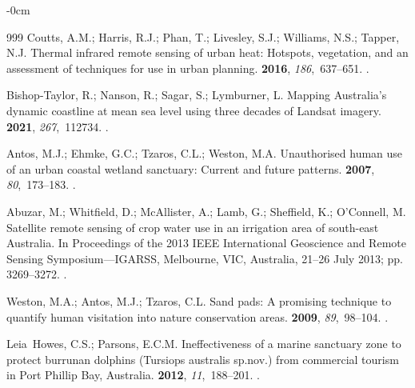 \documentclass[jmse,article,accept,pdftex,oneauthor]{Definitions/mdpi}
\begin{document}
\begin{adjustwidth}{-\extralength}{0cm}
\begin{thebibliography}{999}
Coutts, A.M.; Harris, R.J.; Phan, T.; Livesley, S.J.; Williams, N.S.; Tapper,
  N.J.
\newblock Thermal infrared remote sensing of urban heat: Hotspots, vegetation,
  and an assessment of techniques for use in urban planning.
 {\bf 2016}, {\em 186},~637--651.
.

Bishop-Taylor, R.; Nanson, R.; Sagar, S.; Lymburner, L.
\newblock Mapping Australia's dynamic coastline at mean sea level using three
  decades of Landsat imagery.
 {\bf 2021}, {\em 267},~112734.
.

Antos, M.J.; Ehmke, G.C.; Tzaros, C.L.; Weston, M.A.
\newblock Unauthorised human use of an urban coastal wetland sanctuary: Current
  and future patterns.
 {\bf 2007}, {\em 80},~173--183.
.

Abuzar, M.; Whitfield, D.; McAllister, A.; Lamb, G.; Sheffield, K.; O'Connell,
  M.
\newblock Satellite remote sensing of crop water use in an irrigation area of
  south-east Australia.
\newblock In Proceedings of the 2013 IEEE International Geoscience and Remote
  Sensing Symposium---IGARSS, Melbourne, VIC, Australia, 21--26 July 2013; pp. 3269--3272.
.

Weston, M.A.; Antos, M.J.; Tzaros, C.L.
\newblock Sand pads: A promising technique to quantify human visitation into
  nature conservation areas.
 {\bf 2009}, {\em 89},~98--104.
.

Leia~Howes, C.S.; Parsons, E.C.M.
\newblock Ineffectiveness of a marine sanctuary zone to protect burrunan
  dolphins (Tursiops australis sp.nov.) from commercial tourism in Port Phillip
  Bay, Australia.
 {\bf 2012}, {\em 11},~188--201.
.


\end{thebibliography}
\end{adjustwidth}
\end{document}
